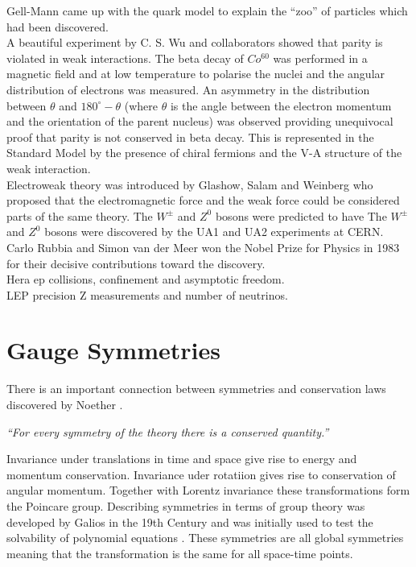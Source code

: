 Gell-Mann came up with the quark model to explain the ``zoo'' of particles which
had been discovered. \\

A beautiful experiment by C. S. Wu and collaborators showed that parity is
violated in weak interactions. The beta decay of $Co^{60}$ was performed in a
magnetic field and at low temperature to polarise the nuclei and the angular
distribution of electrons was measured. An asymmetry in the distribution between
$\theta$ and $180^{\circ} - \theta$ (where $\theta$ is the angle between the
electron momentum and the orientation of the parent nucleus) was observed
providing unequivocal proof that parity is not conserved in beta decay. This is
represented in the Standard Model by the presence of chiral fermions and the V-A 
structure of the weak interaction. \\

Electroweak theory was introduced by Glashow, Salam and Weinberg who proposed
that the electromagnetic force and the weak force could be considered parts of
the same theory. The $W^{\pm}$ and $Z^{0}$ bosons were predicted to have 
The $W^{\pm}$ and $Z^{0}$ bosons were discovered by the UA1 and UA2 experiments
at CERN. Carlo Rubbia and Simon van der Meer won the Nobel Prize for Physics in
1983 for their decisive contributions toward the discovery. \\

Hera ep collisions, confinement and asymptotic freedom. \\

LEP precision Z measurements and number of neutrinos.

\section{Gauge Symmetries}

There is an important connection between symmetries and conservation laws
discovered by Noether \cite{noether}.

\begin{center}
{\it ``For every symmetry of the theory there is a conserved quantity.''} \\
\end{center}

Invariance under translations in time and space give rise to energy and momentum
conservation. Invariance uder rotatiion gives rise to conservation of angular
momentum. Together with Lorentz invariance these transformations form the
Poincare group. Describing symmetries in terms of group theory was developed by
Galios in the 19th Century and was initially used to test the solvability of 
polynomial equations \cite{galois}. These symmetries are all global symmetries
meaning that the transformation is the same for all space-time points. \\

